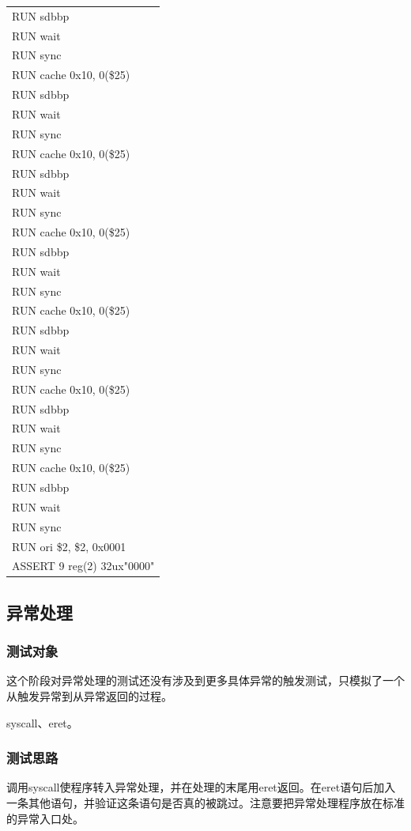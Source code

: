 \documentclass[11pt,utf8]{article}
\begin{document}
{{{{\begin{center}
\begin{longtable}{p{15cm}}
		RUN{ }sdbbp\\
		RUN{ }wait\\
		RUN{ }sync\\
		RUN{ }cache{ }0x10,{ }0(\$25)\\
		RUN{ }sdbbp\\
		RUN{ }wait\\
		RUN{ }sync\\
		RUN{ }cache{ }0x10,{ }0(\$25)\\
		RUN{ }sdbbp\\
		RUN{ }wait\\
		RUN{ }sync\\
		RUN{ }cache{ }0x10,{ }0(\$25)\\
		RUN{ }sdbbp\\
		RUN{ }wait\\
		RUN{ }sync\\
		RUN{ }cache{ }0x10,{ }0(\$25)\\
		RUN{ }sdbbp\\
		RUN{ }wait\\
		RUN{ }sync\\
		RUN{ }cache{ }0x10,{ }0(\$25)\\
		RUN{ }sdbbp\\
		RUN{ }wait\\
		RUN{ }sync\\
		RUN{ }cache{ }0x10,{ }0(\$25)\\
		RUN{ }sdbbp\\
		RUN{ }wait\\
		RUN{ }sync\\
		RUN{ }ori{ }\$2,{ }\$2,{ }0x0001\\
		ASSERT{ }9{ }reg(2){ }32ux"0000"\\
		\hline \end{longtable} \end{center}
}
}

\subsection{异常处理} {
\subsubsection{测试对象} {
这个阶段对异常处理的测试还没有涉及到更多具体异常的触发测试，只模拟了一个从触发异常到从异常返回的过程。

syscall、eret。
}
\subsubsection{测试思路} {
调用syscall使程序转入异常处理，并在处理的末尾用eret返回。在eret语句后加入一条其他语句，并验证这条语句是否真的被跳过。注意要把异常处理程序放在标准的异常入口处。
}
}}}
\end{document}
